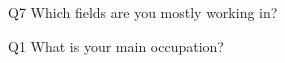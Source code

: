 \begin{description}%
\item{Q7} Which fields are you mostly working in?%
\item{Q1} What is your main occupation?%
\end{description}%
